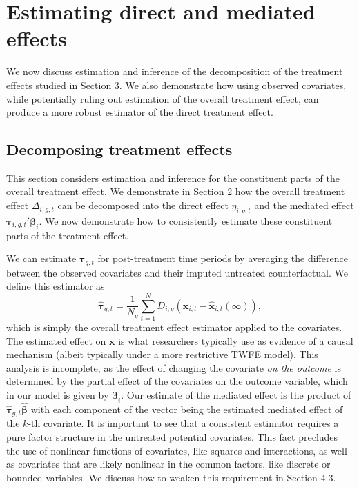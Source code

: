 \documentclass[12pt,fleqn]{article}
\def\*#1{\mathbf{#1}}
\def\+#1{\boldsymbol{#1}}
\begin{document}
\section{Estimating direct and mediated effects}

We now discuss estimation and inference of the decomposition of the treatment effects studied in Section 3. We also demonstrate how using observed covariates, while potentially ruling out estimation of the overall treatment effect, can produce a more robust estimator of the direct treatment effect. 

\subsection{Decomposing treatment effects}

This section considers estimation and inference for the constituent parts of the overall treatment effect. We demonstrate in Section 2 how the overall treatment effect $\Delta_{i,g,t}$ can be decomposed into the direct effect $\eta_{i,g,t}$ and the mediated effect $\+\tau_{i,g,t}' \+\beta_i$. We now demonstrate how to consistently estimate these constituent parts of the treatment effect.



We can estimate $\+\tau_{g,t}$ for post-treatment time periods by averaging the difference between the observed covariates and their imputed untreated counterfactual. We define this estimator as
\begin{equation}
    \widehat{\+\tau}_{g,t} = \frac{1}{N_g} \sum_{i = 1}^N D_{i,g} ( \*x_{i,t} - \widehat{\*x}_{i,t}(\infty) ), \label{x treatment effect}
\end{equation}
which is simply the overall treatment effect estimator applied to the covariates. The estimated effect on $\+x$ is what researchers typically use as evidence of a causal mechanism (albeit typically under a more restrictive TWFE model). This analysis is incomplete, as the effect of changing the covariate \emph{on the outcome} is determined by the partial effect of the covariates on the outcome variable, which in our model is given by $\+\beta_i$. Our estimate of the mediated effect is the product of $\widehat{\+\tau}_{g,t} \widehat{\+\beta}$ with each component of the vector being the estimated mediated effect of the $k$-th covariate. It is important to see that a consistent estimator requires a pure factor structure in the untreated potential covariates. This fact precludes the use of nonlinear functions of covariates, like squares and interactions, as well as covariates that are likely nonlinear in the common factors, like discrete or bounded variables. We discuss how to weaken this requirement in Section 4.3.
\end{document}
